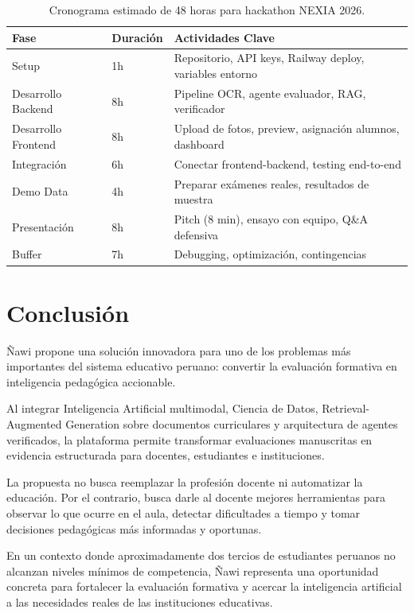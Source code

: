 \documentclass[12pt]{article}
\begin{document}
\begin{table}[H]
\centering
\small
\begin{tabular}{p{2cm} p{3.5cm} p{5.5cm}}
\toprule
\textbf{Fase} & \textbf{Duración} & \textbf{Actividades Clave} \\
\midrule
Setup & 1h & Repositorio, API keys, Railway deploy, variables entorno \\
Desarrollo Backend & 8h & Pipeline OCR, agente evaluador, RAG, verificador \\
Desarrollo Frontend & 8h & Upload de fotos, preview, asignación alumnos, dashboard \\
Integración & 6h & Conectar frontend-backend, testing end-to-end \\
Demo Data & 4h & Preparar exámenes reales, resultados de muestra \\
Presentación & 8h & Pitch (8 min), ensayo con equipo, Q\&A defensiva \\
Buffer & 7h & Debugging, optimización, contingencias \\
\bottomrule
\end{tabular}
\caption{Cronograma estimado de 48 horas para hackathon NEXIA 2026.}
\label{tabla:cronograma}
\end{table}

\section{Conclusión}

Ñawi propone una solución innovadora para uno de los problemas más importantes del sistema educativo peruano: convertir la evaluación formativa en inteligencia pedagógica accionable.

Al integrar Inteligencia Artificial multimodal, Ciencia de Datos, Retrieval-Augmented Generation sobre documentos curriculares y arquitectura de agentes verificados, la plataforma permite transformar evaluaciones manuscritas en evidencia estructurada para docentes, estudiantes e instituciones.

La propuesta no busca reemplazar la profesión docente ni automatizar la educación. Por el contrario, busca darle al docente mejores herramientas para observar lo que ocurre en el aula, detectar dificultades a tiempo y tomar decisiones pedagógicas más informadas y oportunas.

En un contexto donde aproximadamente dos tercios de estudiantes peruanos no alcanzan niveles mínimos de competencia, Ñawi representa una oportunidad concreta para fortalecer la evaluación formativa y acercar la inteligencia artificial a las necesidades reales de las instituciones educativas.
\end{document}
